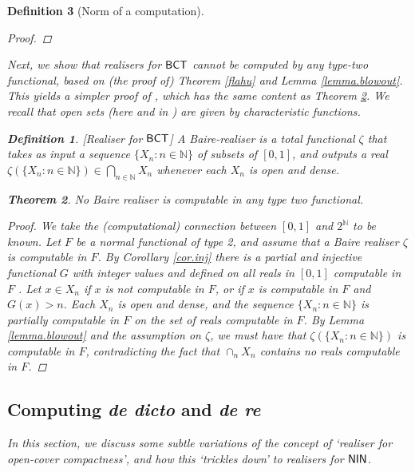 \documentclass[reqno]{amsart}
\newtheorem{thm}{Theorem}
\newtheorem{defi}[thm]{Definition}
\def\bdefi{\begin{defi}\rm}
\def\edefi{\end{defi}}
\def\N{{\mathbb  N}}
\def\NIN{\textup{\textsf{NIN}}}
\def\BCT{\textup{\textsf{BCT}}}
\numberwithin{equation}{section}
\numberwithin{thm}{section}
\begin{document}
\begin{defi}[Norm of a computation]
\begin{proof}
\end{proof}
Next, we show that realisers for $\BCT$ cannot be computed by any type-two functional, based on (the proof of) Theorem \ref{flahu} and Lemma \ref{lemma.blowout}.
This yields a simpler proof of \cite[Theorem 6.6]{dagsamVII}, which has the same content as Theorem \ref{triplez}. 
We recall that open sets (here and in \cite{dagsamVII}) are given by characteristic functions.
\bdefi[Realiser for $\BCT$]
A \emph{Baire-realiser} is a total functional $\zeta$ that takes as input a sequence $ \{X_n : n \in \N\}$ of subsets of $[0,1]$, and outputs a real $\zeta(\{X_n : n \in \N\}) \in \bigcap_{n \in \N}X_n$ whenever each $X_n$ is open and dense.
\edefi
\begin{thm}\label{triplez}
No Baire realiser is computable in any type two functional.  %
\end{thm}
\begin{proof}
We take the (computational) connection between $[0,1]$ and $2^\N$ to be known.
Let $F$ be a normal functional of type 2, and assume that a Baire realiser $\zeta$ is computable in $F$. By Corollary \ref{cor.inj} there is a partial and injective functional $G$ with integer values and defined on all reals in $[0,1]$ computable in $F$ . Let $x \in X_n$ if $x$ is not computable in $F$, or if $x$ is computable in $F$ and $G(x) > n$. Each $X_n$ is open and dense, and the sequence $\{X_n : n \in \N\}$ is partially computable in $F$ on the set of reals computable in $F$. By Lemma \ref{lemma.blowout} and the assumption on $\zeta$, we must have that $\zeta(\{X_n : n \in \N\})$ is computable in $F$, contradicting the fact that $\cap_{n}X_n$ contains no reals computable in $F$.
\end{proof}
\subsection{Computing \emph{de dicto} and \emph{de re}}
In this section, we discuss some subtle variations of the concept of `realiser for open-cover compactness', and how this `trickles down' to realisers for $\NIN$.

\smallskip


\end{defi}
\end{document}
